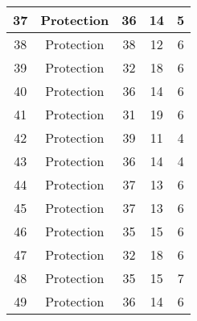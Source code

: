 \documentclass[results.tex]{subfiles}
\begin{document}
\begin{center}
\begin{tabular}{| c || c | c | c | c |}
            \hline
            37                      & Protection                   & 36                     & 14                      & 5                    \\
            \hline
            38                      & Protection                   & 38                     & 12                      & 6                    \\
            \hline
            39                      & Protection                   & 32                     & 18                      & 6                    \\
            \hline
            40                      & Protection                   & 36                     & 14                      & 6                    \\
            \hline
            41                      & Protection                   & 31                     & 19                      & 6                    \\
            \hline
            42                      & Protection                   & 39                     & 11                      & 4                    \\
            \hline
            43                      & Protection                   & 36                     & 14                      & 4                    \\
            \hline
            44                      & Protection                   & 37                     & 13                      & 6                    \\
            \hline
            45                      & Protection                   & 37                     & 13                      & 6                    \\
            \hline
            46                      & Protection                   & 35                     & 15                      & 6                    \\
            \hline
            47                      & Protection                   & 32                     & 18                      & 6                    \\
            \hline
            48                      & Protection                   & 35                     & 15                      & 7                    \\
            \hline
            49                      & Protection                   & 36                     & 14                      & 6                    \\
            \hline
        \end{tabular}
    \end{center}
\end{document}
